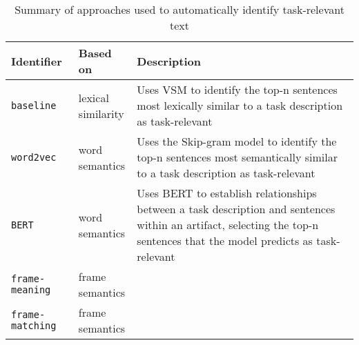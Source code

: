 
\begin{table}[H]
\centering    
\begin{scriptsize}
\begin{threeparttable}
\begin{tabular}{lll}





\textbf{Identifier} & \textbf{Based on} & \textbf{Description} \\

\hline


\texttt{baseline} & 
\parbox[l][1cm][c] {1.5cm}{lexical\\similarity} &
\parbox[l][1cm][c] {8.5cm}{
    Uses VSM to identify the top-n sentences most lexically similar to a task description as task-relevant
}
\\


\texttt{word2vec} & 
\parbox[l][1cm][c] {1.5cm}{word\\semantics} &
\parbox[l][1cm][c] {8.5cm}{
    Uses the Skip-gram model to identify the top-n sentences most semantically similar to a task description as task-relevant
}
\\

\texttt{BERT} & 
\parbox[l][1cm][c] {1.5cm}{word\\semantics} &
\parbox[l][1.4cm][c] {8.5cm}{
    Uses BERT to establish relationships between a task description and sentences within an artifact, selecting the top-n sentences 
    that the model predicts as task-relevant
}
\\


\texttt{frame-meaning} & 
\parbox[l][1cm][c] {1.5cm}{frame\\semantics} &
\parbox[l][1cm][c] {8.5cm}{
}
\\


\texttt{frame-matching} & 
\parbox[l][1cm][c] {1.5cm}{frame\\semantics} &
\parbox[l][1cm][c] {8.5cm}{
}
\\



\hline


\end{tabular}
\end{threeparttable}
\end{scriptsize}
\caption{Summary of approaches used to automatically identify task-relevant text}
\label{tbl:approaches-summary}
\end{table}


